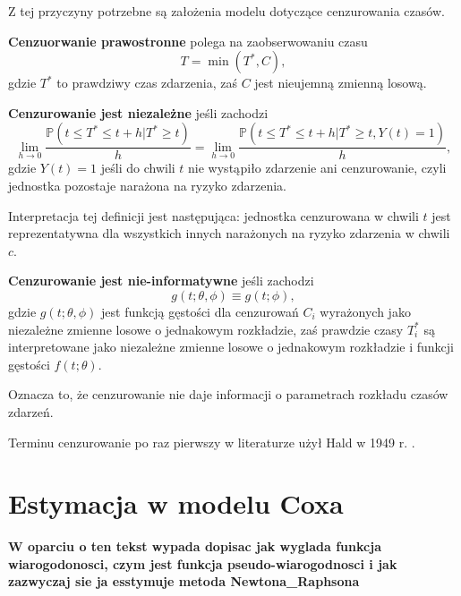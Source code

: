 Z tej przyczyny potrzebne są założenia modelu dotyczące cenzurowania czasów.

\begin{definition}
\textbf{Cenzuorwanie prawostronne} polega na zaobserwowaniu czasu 
$$T= \min(T^*, C),$$
gdzie $T^*$ to prawdziwy czas zdarzenia, zaś $C$ jest nieujemną zmienną losową.
\end{definition}


\begin{definition}
\textbf{Cenzurowanie jest niezależne} jeśli zachodzi
$$ \lim\limits_{h\rightarrow 0}\dfrac{\mathbb{P}(t \leq T^* \leq t +h | T^* \geq t)}{h} =  \lim\limits_{h\rightarrow 0}\dfrac{\mathbb{P}(t \leq T^* \leq t +h | T^* \geq t, Y(t) = 1)}{h},$$
gdzie $Y(t) = 1$ jeśli do chwili $t$ nie wystąpiło zdarzenie ani cenzurowanie, czyli jednostka pozostaje narażona na ryzyko zdarzenia.
\end{definition}

Interpretacja tej definicji jest następująca: jednostka cenzurowana w chwili $t$ jest reprezentatywna dla wszystkich innych narażonych na ryzyko zdarzenia w chwili $c$.

\begin{definition}
\textbf{Cenzurowanie jest nie-informatywne} jeśli zachodzi
$$g(t;\theta, \phi) \equiv g(t;\phi),$$
gdzie $g(t;\theta, \phi)$ jest funkcją gęstości dla cenzurowań $C_i$ wyrażonych jako niezależne zmienne losowe o jednakowym rozkładzie, zaś prawdzie czasy $T^*_i$ są interpretowane jako niezależne zmienne losowe o jednakowym rozkładzie i funkcji gęstości $f(t;\theta)$.
\end{definition}

Oznacza to, że cenzurowanie nie daje informacji o parametrach rozkładu czasów zdarzeń.

Terminu cenzurowanie po raz pierwszy w literaturze użył Hald w 1949 r. \cite{hald}.

\section{Estymacja w modelu Coxa}

\textbf{W oparciu o ten tekst wypada dopisac jak wyglada funkcja wiarogodonosci, czym jest funkcja pseudo-wiarogodnosci i jak zazwyczaj sie ja esstymuje metoda Newtona_Raphsona}

